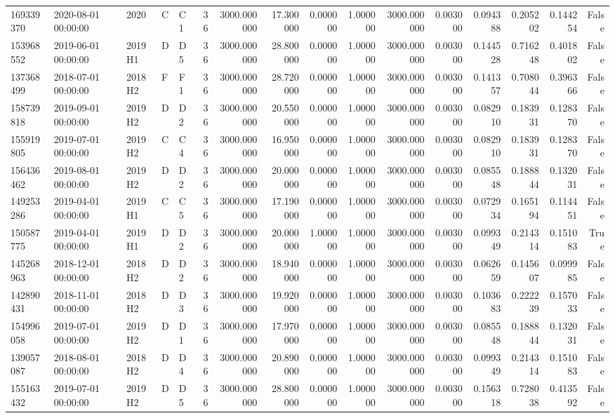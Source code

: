 \begin{tabular}{lllllrrrrrrrrrrr}
169339370 & 2020-08-01 00:00:00 & 2020 & C & C1 & 36 & 3000.000000 & 17.300000 & 0.000000 & 1.000000 & 3000.000000 & 0.003000 & 0.094388 & 0.205202 & 0.144254 & False \\
153968552 & 2019-06-01 00:00:00 & 2019H1 & D & D5 & 36 & 3000.000000 & 28.800000 & 0.000000 & 1.000000 & 3000.000000 & 0.003000 & 0.144528 & 0.716248 & 0.401802 & False \\
137368499 & 2018-07-01 00:00:00 & 2018H2 & F & F1 & 36 & 3000.000000 & 28.720000 & 0.000000 & 1.000000 & 3000.000000 & 0.003000 & 0.141357 & 0.708044 & 0.396366 & False \\
158739818 & 2019-09-01 00:00:00 & 2019H2 & D & D2 & 36 & 3000.000000 & 20.550000 & 0.000000 & 1.000000 & 3000.000000 & 0.003000 & 0.082910 & 0.183931 & 0.128370 & False \\
155919805 & 2019-07-01 00:00:00 & 2019H2 & C & C4 & 36 & 3000.000000 & 16.950000 & 0.000000 & 1.000000 & 3000.000000 & 0.003000 & 0.082910 & 0.183931 & 0.128370 & False \\
156436462 & 2019-08-01 00:00:00 & 2019H2 & D & D2 & 36 & 3000.000000 & 20.000000 & 0.000000 & 1.000000 & 3000.000000 & 0.003000 & 0.085548 & 0.188844 & 0.132031 & False \\
149253286 & 2019-04-01 00:00:00 & 2019H1 & C & C5 & 36 & 3000.000000 & 17.190000 & 0.000000 & 1.000000 & 3000.000000 & 0.003000 & 0.072934 & 0.165194 & 0.114451 & False \\
150587775 & 2019-04-01 00:00:00 & 2019H1 & D & D2 & 36 & 3000.000000 & 20.000000 & 1.000000 & 1.000000 & 3000.000000 & 0.003000 & 0.099349 & 0.214314 & 0.151083 & True \\
145268963 & 2018-12-01 00:00:00 & 2018H2 & D & D2 & 36 & 3000.000000 & 18.940000 & 0.000000 & 1.000000 & 3000.000000 & 0.003000 & 0.062659 & 0.145607 & 0.099985 & False \\
142890431 & 2018-11-01 00:00:00 & 2018H2 & D & D3 & 36 & 3000.000000 & 19.920000 & 0.000000 & 1.000000 & 3000.000000 & 0.003000 & 0.103683 & 0.222239 & 0.157033 & False \\
154996058 & 2019-07-01 00:00:00 & 2019H2 & D & D1 & 36 & 3000.000000 & 17.970000 & 0.000000 & 1.000000 & 3000.000000 & 0.003000 & 0.085548 & 0.188844 & 0.132031 & False \\
139057087 & 2018-08-01 00:00:00 & 2018H2 & D & D4 & 36 & 3000.000000 & 20.890000 & 0.000000 & 1.000000 & 3000.000000 & 0.003000 & 0.099349 & 0.214314 & 0.151083 & False \\
155163432 & 2019-07-01 00:00:00 & 2019H2 & D & D5 & 36 & 3000.000000 & 28.800000 & 0.000000 & 1.000000 & 3000.000000 & 0.003000 & 0.156318 & 0.728038 & 0.413592 & False \\

\end{tabular}
